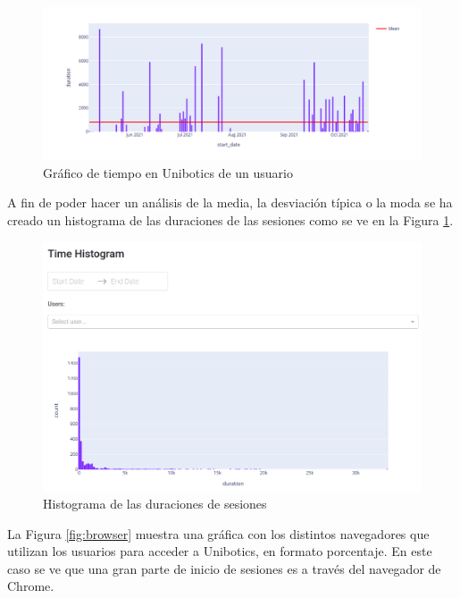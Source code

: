 \begin{figure}[H]
    \centering
    \includegraphics[width=18cm, keepaspectratio]{img/time_user.png}
    \caption{Gráfico de tiempo en Unibotics de un usuario}
    \label{fig:time_user}
\end{figure}
A fin de poder hacer un análisis de la media, la desviación típica o la moda se ha creado un histograma de las duraciones de las sesiones como se ve en la Figura \ref{fig:time_user}.
\begin{figure}[H]
    \centering
    \includegraphics[width=16cm, keepaspectratio]{img/time_histogram.png}
    \caption{Histograma de las duraciones de sesiones}
    \label{fig:time_histogram}
\end{figure}
\newpage
La Figura \ref{fig:browser} muestra una gráfica con los distintos navegadores que utilizan los usuarios para acceder a Unibotics,  en formato porcentaje. En este caso se ve que una gran parte de inicio de sesiones es a través del navegador de Chrome.


